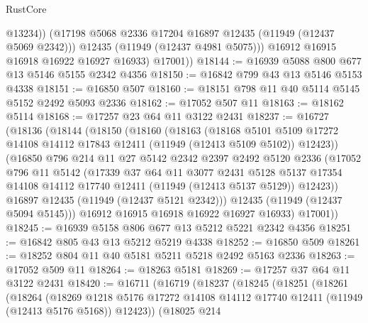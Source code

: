 \begin{lexlean}{RustCore}
\begin{coremodule}
                @13234))
            (@17198 @5068 @2336 @17204 @16897 @12435 (@11949 (@12437 @5069 @2342)))
            @12435
            (@11949 (@12437 @4981 @5075)))
          @16912
          @16915
          @16918
          @16922
          @16927
          @16933)
        @17001))
@18144 := @16939 @5088 @800 @677 @13 @5146 @5155 @2342 @4356
@18150 := @16842 @799 @43 @13 @5146 @5153 @4338
@18151 := @16850 @507
@18160 := @18151 @798 @11 @40 @5114 @5145 @5152 @2492 @5093 @2336
@18162 := @17052 @507 @11
@18163 := @18162 @5114
@18168 := @17257 @23 @64 @11 @3122 @2431
@18237 := @16727
    (@18136
      (@18144
        (@18150
          (@18160
            (@18163
              (@18168
                @5101
                @5109
                @17272
                @14108
                @14112
                @17843
                @12411
                (@11949 (@12413 @5109 @5102))
                @12423))
            (@16850
              @796
              @214
              @11
              @27
              @5142
              @2342
              @2397
              @2492
              @5120
              @2336
              (@17052
                @796
                @11
                @5142
                (@17339
                  @37
                  @64
                  @11
                  @3077
                  @2431
                  @5128
                  @5137
                  @17354
                  @14108
                  @14112
                  @17740
                  @12411
                  (@11949 (@12413 @5137 @5129))
                  @12423))
              @16897
              @12435
              (@11949 (@12437 @5121 @2342)))
            @12435
            (@11949 (@12437 @5094 @5145)))
          @16912
          @16915
          @16918
          @16922
          @16927
          @16933)
        @17001))
@18245 := @16939 @5158 @806 @677 @13 @5212 @5221 @2342 @4356
@18251 := @16842 @805 @43 @13 @5212 @5219 @4338
@18252 := @16850 @509
@18261 := @18252 @804 @11 @40 @5181 @5211 @5218 @2492 @5163 @2336
@18263 := @17052 @509 @11
@18264 := @18263 @5181
@18269 := @17257 @37 @64 @11 @3122 @2431
@18420 := @16711
    (@16719
      (@18237
        (@18245
          (@18251
            (@18261
              (@18264
                (@18269
                  @1218
                  @5176
                  @17272
                  @14108
                  @14112
                  @17740
                  @12411
                  (@11949 (@12413 @5176 @5168))
                  @12423))
              (@18025
                @214

\end{coremodule}
\end{lexlean}
